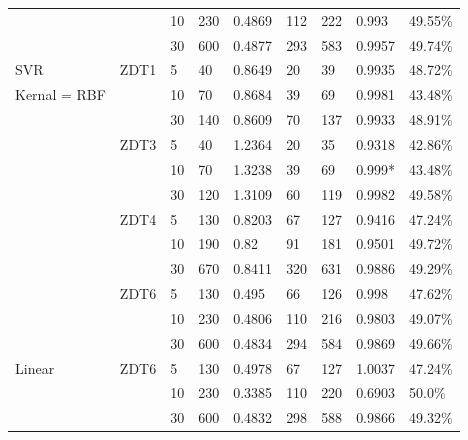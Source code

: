 \documentclass[sigconf,review,nonacm]{acmart}
\begin{document}
\begin{table}[!htbp]
\begin{tabular}{l|llllll|l|l}
 & & 10 & 230 & 0.4869 & 112 & 222 & 0.993 & 49.55\% \\
 & & 30 & 600 & 0.4877 & 293 & 583 & 0.9957 & 49.74\% \\ \hline
SVR & ZDT1 & 5 & 40 & 0.8649 & 20 & 39 & 0.9935 & 48.72\% \\ 
Kernal = RBF & & 10 & 70 & 0.8684 & 39 & 69 & 0.9981 & 43.48\% \\
 & & 30 & 140 & 0.8609 & 70 & 137 & 0.9933 & 48.91\% \\
 & ZDT3 & 5 & 40 & 1.2364 & 20 & 35 & 0.9318 & 42.86\% \\
 & & 10 & 70 & 1.3238 & 39 & 69 & 0.999* & 43.48\% \\
 & & 30 & 120 & 1.3109 & 60 & 119 & 0.9982 & 49.58\% \\
 & ZDT4 & 5 & 130 & 0.8203 & 67 & 127 & 0.9416 & 47.24\% \\
 & & 10 & 190 & 0.82 & 91 & 181 & 0.9501 & 49.72\% \\
 & & 30 & 670 & 0.8411 & 320 & 631 & 0.9886 & 49.29\% \\
 & ZDT6 & 5 & 130 & 0.495 & 66 & 126 & 0.998 & 47.62\% \\
 & & 10 & 230 & 0.4806 & 110 & 216 & 0.9803 & 49.07\% \\
 & & 30 & 600 & 0.4834 & 294 & 584 & 0.9869 & 49.66\% \\ \hline
Linear & ZDT6 & 5 & 130 & 0.4978 & 67 & 127 & 1.0037 & 47.24\% \\
 & & 10 & 230 & 0.3385 & 110 & 220 & 0.6903 & 50.0\% \\
 & & 30 & 600 & 0.4832 & 298 & 588 & 0.9866 & 49.32\% \\
\end{tabular} 
\end{table}
\end{document}
